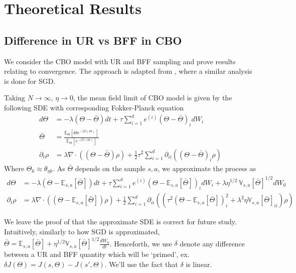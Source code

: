 \documentclass[10.5pt]{article}
\newcommand\bb{\mathbb}
\begin{document}
\section{Theoretical Results}
\subsection{Difference in UR vs BFF in CBO}
We consider the CBO model with UR and BFF sampling and prove results relating to convergence. The approach is adapted from \cite{zhu2020borrowing}, where a similar analysis is done for SGD.

Taking $N\to \infty$, $\eta\to 0$, the mean field limit of CBO model is given by the following SDE with corresponding Fokker-Planck equation
\begin{align*}
  d\Theta &= -\lambda(\Theta - \bar \Theta)dt + \tau \sum_{i=1}^d e^{(i)} (\Theta - \bar \Theta)_i dW_i \\
  \bar \Theta &= \frac{\bb E_\Theta[ \Theta e^{-\beta J(\Theta)} ]}{\bb E_\Theta[e^{-\beta J(\Theta)}]}\\
  \partial_t \rho &= \lambda \nabla \cdot ((\Theta - \bar \Theta) \rho ) + \frac{1}{2}\tau^2 \sum_{i=1}^d\partial_{ii}((\Theta - \bar \Theta)_i \rho)
\end{align*}
Where $\Theta_{k}\approx \theta_{\eta k}$.
As $\bar \Theta$ depends on the sample $s,a$, we approximate the process as
\begin{align*}
  d\Theta &= -\lambda (\Theta - \bb E_{s,a}[\bar \Theta])dt + \tau \sum_{i=1}^d e^{(i)} (\Theta - \bb E_{s,a}[\bar \Theta])_i dW_i + \lambda \eta^{1/2}\, \bb V_{s,a}[\bar\Theta]^{1/2}  dW_0\\
  \partial_t \rho &= \lambda \nabla \cdot ((\Theta - \bb E_{s,a}[\bar \Theta]) \rho ) + \frac{1}{2} \sum_{i=1}^d\partial_{ii}((\tau^2(\Theta - \bb E_{s,a}[\bar \Theta])^2_i+\lambda^2\eta \bb V_{s,a}[\bar \Theta]_{ii} ) \rho)
\end{align*}

We leave the proof of that the approximate SDE is correct for future study. Intuitively, similarly to how SGD is approximated, $\bar \Theta = \bb E_{s,a}[\bar \Theta] + \eta^{1/2}\bb V_{s,a}[\bar \Theta]^{1/2}\frac{dW_0}{dt}$.
Henceforth, we use $\delta$ denote any difference between a UR and BFF quantity which will be `primed', ex. $\delta J(\Theta)= J(s,\Theta) - J(s',\Theta)$. We'll use the fact that $\delta$ is linear.
\end{document}
